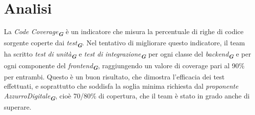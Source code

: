 \section*{Analisi}
La \emph{Code Coverage}\textsubscript{\textbf{\textit{G}}} è un indicatore che misura la percentuale di righe di codice sorgente coperte dai \emph{test}\textsubscript{\textbf{\textit{G}}}. Nel tentativo di migliorare questo indicatore, il team ha scritto \emph{test di unità}\textsubscript{\textbf{\textit{G}}} e \emph{test di integrazione}\textsubscript{\textbf{\textit{G}}} per ogni classe del \emph{backend}\textsubscript{\textbf{\textit{G}}} e per ogni componente del \emph{frontend}\textsubscript{\textbf{\textit{G}}}, raggiungendo un valore di coverage pari al 90\% per entrambi. Questo è un buon risultato, che dimostra l'efficacia dei test effettuati, e soprattutto che soddisfa la soglia minima richiesta dal \emph{proponente} \emph{AzzurroDigitale}\textsubscript{\textbf{\textit{G}}}, cioè 70/80\% di copertura, che il team è stato in grado anche di superare.
